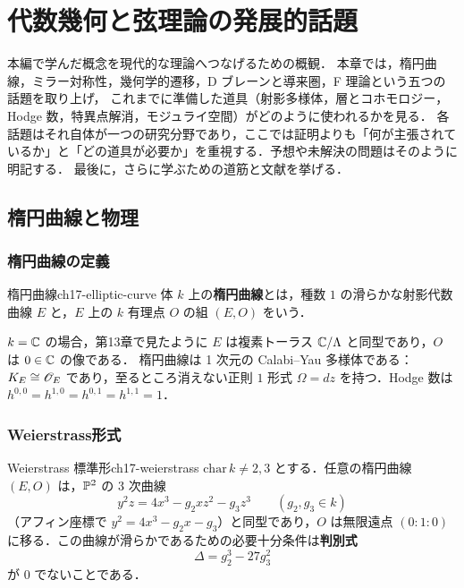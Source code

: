\chapter{代数幾何と弦理論の発展的話題}
\label{ch:ch17}

\begin{chapterlead}
本編で学んだ概念を現代的な理論へつなげるための概観．
本章では，楕円曲線，ミラー対称性，幾何学的遷移，D ブレーンと導来圏，F 理論という五つの話題を取り上げ，
これまでに準備した道具（射影多様体，層とコホモロジー，Hodge 数，特異点解消，モジュライ空間）がどのように使われるかを見る．
各話題はそれ自体が一つの研究分野であり，ここでは証明よりも「何が主張されているか」と「どの道具が必要か」を重視する．予想や未解決の問題はそのように明記する．
最後に，さらに学ぶための道筋と文献を挙げる．
\end{chapterlead}

\section{楕円曲線と物理}

\subsection{楕円曲線の定義}

\begin{mydef}{楕円曲線}{ch17-elliptic-curve}
体 $k$ 上の\textbf{楕円曲線}とは，種数 $1$ の滑らかな射影代数曲線 $E$ と，$E$ 上の $k$ 有理点 $O$ の組 $(E,O)$ をいう．
\end{mydef}

$k=\mathbb{C}$ の場合，第13章で見たように $E$ は複素トーラス $\mathbb{C}/\Lambda$ と同型であり，$O$ は $0\in\mathbb{C}$ の像である．
楕円曲線は 1 次元の Calabi--Yau 多様体である：$K_E\cong\mathscr{O}_E$ であり，至るところ消えない正則 $1$ 形式 $\Omega=dz$ を持つ．Hodge 数は $h^{0,0}=h^{1,0}=h^{0,1}=h^{1,1}=1$．

\subsection{Weierstrass形式}

\begin{mythm}{Weierstrass 標準形}{ch17-weierstrass}
$\mathrm{char}\,k\neq2,3$ とする．任意の楕円曲線 $(E,O)$ は，$\mathbb{P}^2$ の 3 次曲線
\begin{equation}
y^2z=4x^3-g_2xz^2-g_3z^3\qquad(g_2,g_3\in k)
\label{eq:ch17-weierstrass}
\end{equation}
（アフィン座標で $y^2=4x^3-g_2x-g_3$）と同型であり，$O$ は無限遠点 $(0:1:0)$ に移る．この曲線が滑らかであるための必要十分条件は\textbf{判別式}
\[
\Delta=g_2^3-27g_3^2
\]
が $0$ でないことである．
\end{mythm}

